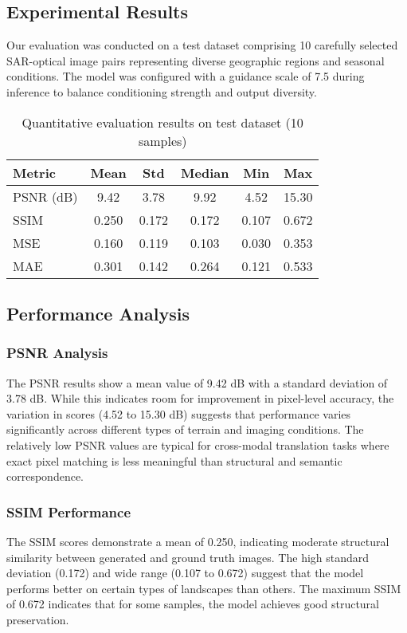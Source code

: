 \subsection{Experimental Results}

Our evaluation was conducted on a test dataset comprising 10 carefully selected SAR-optical image pairs representing diverse geographic regions and seasonal conditions. The model was configured with a guidance scale of 7.5 during inference to balance conditioning strength and output diversity.

\begin{table}[h!]
\centering
\begin{tabular}{|l|c|c|c|c|c|}
\hline
\textbf{Metric} & \textbf{Mean} & \textbf{Std} & \textbf{Median} & \textbf{Min} & \textbf{Max} \\
\hline
PSNR (dB) & 9.42 & 3.78 & 9.92 & 4.52 & 15.30 \\
SSIM & 0.250 & 0.172 & 0.172 & 0.107 & 0.672 \\
MSE & 0.160 & 0.119 & 0.103 & 0.030 & 0.353 \\
MAE & 0.301 & 0.142 & 0.264 & 0.121 & 0.533 \\
\hline
\end{tabular}
\caption{Quantitative evaluation results on test dataset (10 samples)}
\label{tab:evaluation_results}
\end{table}

\subsection{Performance Analysis}

\subsubsection{PSNR Analysis}
The PSNR results show a mean value of 9.42 dB with a standard deviation of 3.78 dB. While this indicates room for improvement in pixel-level accuracy, the variation in scores (4.52 to 15.30 dB) suggests that performance varies significantly across different types of terrain and imaging conditions. The relatively low PSNR values are typical for cross-modal translation tasks where exact pixel matching is less meaningful than structural and semantic correspondence.

\subsubsection{SSIM Performance}
The SSIM scores demonstrate a mean of 0.250, indicating moderate structural similarity between generated and ground truth images. The high standard deviation (0.172) and wide range (0.107 to 0.672) suggest that the model performs better on certain types of landscapes than others. The maximum SSIM of 0.672 indicates that for some samples, the model achieves good structural preservation.

